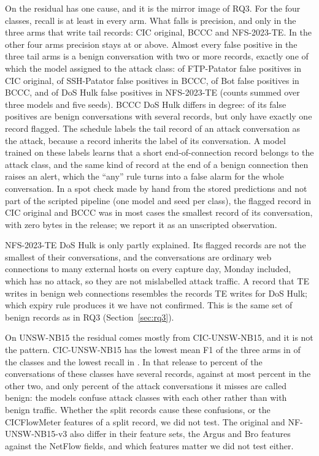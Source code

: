 On \cicids{} the residual has one cause, and it is the mirror image of RQ3. For the four classes, recall is at least \RQfourResRecallMin{} in every arm. What falls is precision, and only in the three arms that write tail records: CIC original, BCCC and NFS-2023-TE. In the other four arms precision stays at \RQfourPrecOtherMin{} or above. Almost every false positive in the three tail arms is a benign conversation with two or more records, exactly one of which the model assigned to the attack class: \RQfourFpOneFtp{} of \RQfourFpFtp{} FTP-Patator false positives in CIC original, \RQfourFpOneSsh{} of \RQfourFpSsh{} SSH-Patator false positives in BCCC, \RQfourFpOneBot{} of \RQfourFpBot{} Bot false positives in BCCC, and \RQfourFpOneHulk{} of \RQfourFpHulk{} DoS Hulk false positives in NFS-2023-TE (counts summed over three models and five seeds). BCCC DoS Hulk differs in degree: \RQfourFpMultiHulkBccc{} of its \RQfourFpHulkBccc{} false positives are benign conversations with several records, but only \RQfourFpOneHulkBccc{} have exactly one record flagged. The schedule labels the tail record of an attack conversation as the attack, because a record inherits the label of its conversation. A model trained on these labels learns that a short end-of-connection record belongs to the attack class, and the same kind of record at the end of a benign connection then raises an alert, which the ``any'' rule turns into a false alarm for the whole conversation. In a spot check made by hand from the stored predictions and not part of the scripted pipeline (one model and seed per class), the flagged record in CIC original and BCCC was in most cases the smallest record of its conversation, with zero bytes in the release; we report it as an unscripted observation.

NFS-2023-TE DoS Hulk is only partly explained. Its flagged records are not the smallest of their conversations, and the conversations are ordinary web connections to many external hosts on every capture day, Monday included, which has no attack, so they are not mislabelled attack traffic. A record that TE writes in benign web connections resembles the records TE writes for DoS Hulk; which expiry rule produces it we have not confirmed. This is the same set of benign records as in RQ3 (Section~\ref{sec:rq3}).

On UNSW-NB15 the residual comes mostly from CIC-UNSW-NB15, and it is not the \cicids{} pattern. CIC-UNSW-NB15 has the lowest mean F1 of the three arms in \RQfourUnswCicLowestFone{} of the \RQfourLargeUnsw{} classes and the lowest recall in \RQfourUnswCicLowestRecall{}. In that release \RQfourUnswCicMultiMin{} to \RQfourUnswCicMultiMax{} percent of the conversations of these classes have several records, against at most \RQfourUnswOtherMultiMax{} percent in the other two, and only \RQfourUnswCicFnBenign{} percent of the attack conversations it misses are called benign: the models confuse attack classes with each other rather than with benign traffic. Whether the split records cause these confusions, or the CICFlowMeter features of a split record, we did not test. The original and NF-UNSW-NB15-v3 also differ in their feature sets, the Argus and Bro features against the NetFlow fields, and which features matter we did not test either.

